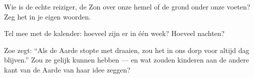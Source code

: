 \begin{exercise}[$\star$]\label{exo:g1:day-and-night:7}
Wie is de echte reiziger, de Zon over onze hemel of de grond onder
onze voeten? Zeg het in je eigen woorden.
\end{exercise}

\begin{exercise}[$\star$]\label{exo:g1:day-and-night:8}
Tel mee met de kalender: hoeveel  zijn er in één week?
Hoeveel nachten?
\end{exercise}

\begin{exercise}[$\star\star$]\label{exo:g1:day-and-night:9}
Zoe zegt: ``Als de Aarde stopte met draaien, zou het in ons dorp voor
altijd dag blijven.'' Zou ze gelijk kunnen hebben --- en wat zouden
kinderen aan de andere kant van de Aarde van haar idee zeggen?
\end{exercise}
